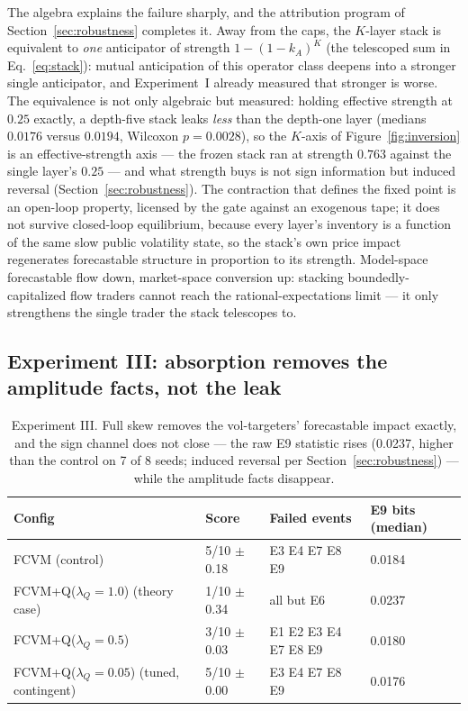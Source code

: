 \documentclass[11pt]{article}
\newcommand{\cfg}[1]{\mbox{#1}}
\begin{document}
The algebra explains the failure sharply, and the attribution program of
Section~\ref{sec:robustness} completes it. Away from the caps, the $K$-layer
stack is equivalent to \emph{one} anticipator of strength $1-(1-k_A)^K$
(the telescoped sum in Eq.~\eqref{eq:stack}):
mutual anticipation of this operator class deepens into a stronger single
anticipator, and Experiment~I already measured that stronger is worse. The
equivalence is not only algebraic but measured: holding effective
strength at $0.25$ exactly, a depth-five stack leaks \emph{less} than the
depth-one layer (medians $0.0176$ versus $0.0194$, Wilcoxon
$p = 0.0028$), so the $K$-axis of Figure~\ref{fig:inversion} is an
effective-strength axis --- the frozen stack ran at strength $0.763$
against the single layer's $0.25$ --- and what strength buys is not sign
information but induced reversal (Section~\ref{sec:robustness}). The
contraction that defines the fixed point is an open-loop property, licensed by
the gate against an exogenous tape; it does not survive closed-loop
equilibrium, because every layer's inventory is a function of the same slow
public volatility state, so the stack's own price impact regenerates
forecastable structure in proportion to its strength. Model-space
forecastable flow down, market-space conversion up: stacking
boundedly-capitalized flow traders cannot reach the rational-expectations
limit --- it only strengthens the single trader the stack telescopes to.

\subsection{Experiment III: absorption removes the amplitude facts, not the leak}
\label{sec:deca4}

\begin{table}[t]
\centering\small
\setlength{\tabcolsep}{5pt}%
\begin{tabular}{llll}
\toprule
Config & Score & Failed events & E9 bits (median) \\
\midrule
\cfg{FCVM} (control)              & 5/10 $\pm$ 0.18 & E3 E4 E7 E8 E9 & 0.0184 \\
\cfg{FCVM+Q}($\lambda_Q{=}1.0$) (theory case) & 1/10 $\pm$ 0.34 & all but E6 & 0.0237 \\
\cfg{FCVM+Q}($\lambda_Q{=}0.5$)   & 3/10 $\pm$ 0.03 & E1 E2 E3 E4 E7 E8 E9 & 0.0180 \\
\cfg{FCVM+Q}($\lambda_Q{=}0.05$) (tuned, contingent) & 5/10 $\pm$ 0.00 & E3 E4 E7 E8 E9 & 0.0176 \\
\bottomrule
\end{tabular}
\caption{Experiment III. Full skew removes the vol-targeters' forecastable
impact exactly, and the sign channel does not close --- the raw E9
statistic rises (0.0237, higher than the control on 7 of 8 seeds; induced
reversal per Section~\ref{sec:robustness}) --- while the amplitude facts
disappear.}
\label{tab:deca4}
\end{table}
\end{document}
